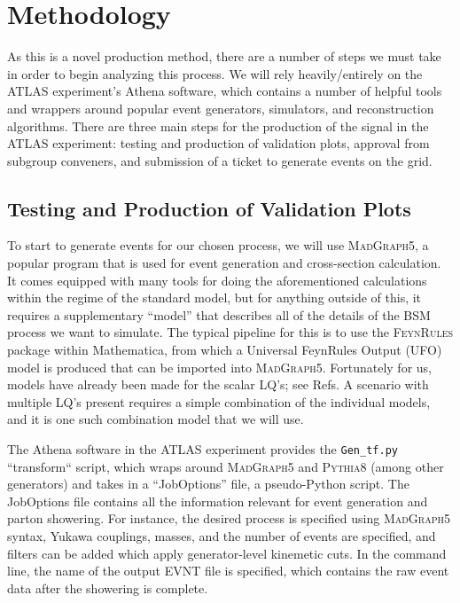 \section{Methodology}\label{methodology}
    As this is a novel production method, there are a number of steps we must take in order to begin analyzing this process. We will rely heavily/entirely on the ATLAS experiment's Athena software, which contains a number of helpful tools and wrappers around popular event generators, simulators, and reconstruction algorithms. There are three main steps for the production of the signal in the ATLAS experiment: testing and production of validation plots, approval from subgroup conveners, and submission of a ticket to generate events on the grid.

    \subsection{Testing and Production of Validation Plots}
        To start to generate events for our chosen process, we will use \textsc{MadGraph5}, a popular program that is used for event generation and cross-section calculation. It comes equipped with many tools for doing the aforementioned calculations within the regime of the standard model, but for anything outside of this, it requires a supplementary ``model'' that describes all of the details of the BSM process we want to simulate. The typical pipeline for this is to use the \textsc{FeynRules} package within Mathematica, from which a Universal FeynRules Output (UFO) model is produced that can be imported into \textsc{MadGraph5}. Fortunately for us, models have already been made for the scalar LQ's; see Refs\cite{Dorsner_2018,Dorsner_2021}. A scenario with multiple LQ's present requires a simple combination of the individual models, and it is one such combination model that we will use.

        The Athena software in the ATLAS experiment provides the \texttt{Gen_tf.py} ``transform`` script, which wraps around \textsc{MadGraph5} and \textsc{Pythia8} (among other generators) and takes in a ``JobOptions'' file, a pseudo-Python script. The JobOptions file contains all the information relevant for event generation and parton showering. For instance, the desired process is specified using \textsc{MadGraph5} syntax, Yukawa couplings, masses, and the number of events are specified, and filters can be added which apply generator-level kinemetic cuts. In the command line, the name of the output EVNT file is specified, which contains the raw event data after the showering is complete.

